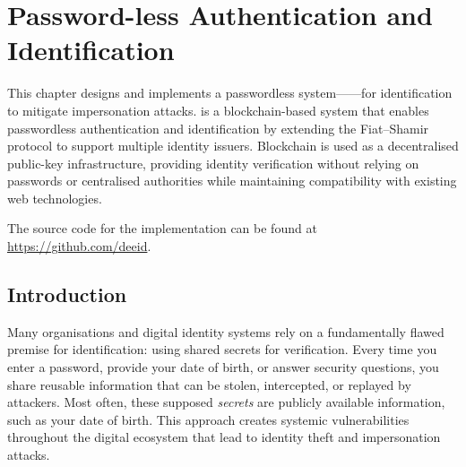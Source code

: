 \chapter{Password-less Authentication and Identification}
\label{chp::deeid}

This chapter designs and implements a passwordless system---\deeid---for identification to mitigate impersonation attacks. \deeid is a blockchain-based system that enables passwordless authentication and identification by extending the Fiat--Shamir protocol to support multiple identity issuers. Blockchain is used as a decentralised public-key infrastructure, providing identity verification without relying on passwords or centralised authorities while maintaining compatibility with existing web technologies.

The source code for the implementation can be found at \url{https://github.com/deeid}.

\section{Introduction}
\label{sec::chp6::introduction}

Many organisations and digital identity systems rely on a fundamentally flawed premise for identification: using shared secrets for verification. Every time you enter a password, provide your date of birth, or answer security questions, you share reusable information that can be stolen, intercepted, or replayed by attackers. Most often, these supposed \textit{secrets} are publicly available information, such as your date of birth. This approach creates systemic vulnerabilities throughout the digital ecosystem that lead to identity theft and impersonation attacks.

